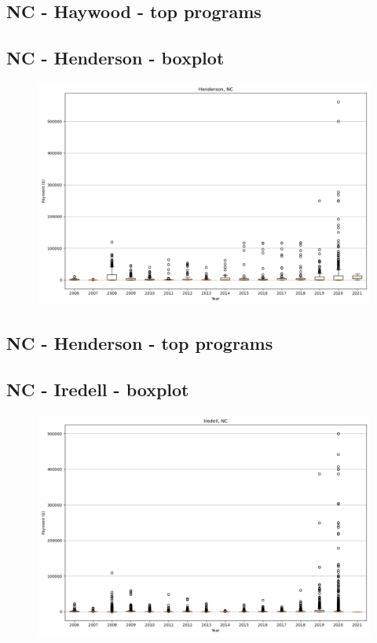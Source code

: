 \subsection*{NC - Haywood - top programs}

\newpage
\subsection*{NC - Henderson - boxplot}
\begin{figure}[h]
\centering
\includegraphics[width=7in]{../output/boxplots/counties/Henderson-NC_boxplot.png}
\end{figure}


\subsection*{NC - Henderson - top programs}

\newpage
\subsection*{NC - Iredell - boxplot}
\begin{figure}[h]
\centering
\includegraphics[width=7in]{../output/boxplots/counties/Iredell-NC_boxplot.png}
\end{figure}


